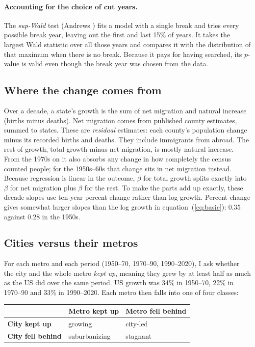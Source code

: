 \documentclass[11pt]{article}
\begin{document}
\paragraph{Accounting for the choice of cut years.} The \emph{sup-Wald} test (Andrews
\cite{andrews}) fits a model with a single break and tries every possible break year, leaving out
the first and last 15\% of years. It takes the largest Wald statistic over all those years and
compares it with the distribution of that maximum when there is no break. Because it pays for
having searched, its $p$-value is valid even though the break year was chosen from the data.

\subsection{Where the change comes from}
Over a decade, a state's growth is the sum of net migration and natural increase (births minus
deaths). Net migration comes from published county estimates, summed to states. These are
\emph{residual} estimates: each county's population change minus its recorded births and deaths.
They include immigrants from abroad. The rest of growth, total growth minus net migration, is
mostly natural increase. From the 1970s on it also absorbs any change in how completely the census
counted people; for the 1950s--60s that change sits in net migration instead. Because regression is
linear in the outcome, $\beta$ for total growth splits exactly into $\beta$ for net migration plus
$\beta$ for the rest. To make the parts add up exactly, these decade slopes use ten-year percent
change rather than log growth. Percent change gives somewhat larger slopes than the log growth in
equation~(\ref{eq:basic}): 0.35 against 0.28 in the 1950s.

\subsection{Cities versus their metros}
\label{sec:citymetro}
For each metro and each period (1950--70, 1970--90, 1990--2020), I ask whether the city and the
whole metro \emph{kept up}, meaning they grew by at least half as much as the US did over the same
period. US growth was 34\% in 1950--70, 22\% in 1970--90 and 33\% in 1990--2020. Each metro then
falls into one of four classes:

\begin{center}\small
\begin{tabular}{lll}
\toprule
& \textbf{Metro kept up} & \textbf{Metro fell behind} \\
\midrule
\textbf{City kept up}      & growing        & city-led \\
\textbf{City fell behind}  & suburbanizing  & stagnant \\
\bottomrule
\end{tabular}
\end{center}
\end{document}
